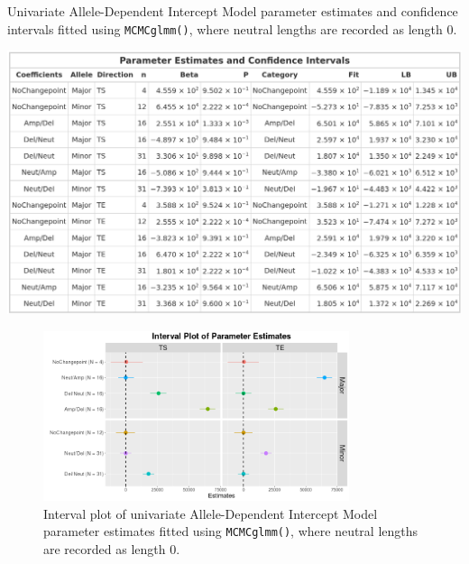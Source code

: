 \begin{table}[!htb]
\centering
\caption[Univariate Allele-Dependent Intercept Model parameter estimates and confidence intervals fitted using \texttt{MCMCglmm()}.]{Univariate Allele-Dependent Intercept Model parameter estimates and confidence intervals fitted using \texttt{MCMCglmm()}, where neutral lengths are recorded as length 0.}
      
\includegraphics[width = 1\textwidth]{../tables/Chapter_5/Univariate_MCMC_7_AD_Model_Pred.png}
\end{table}

\begin{figure}[!htb]
\vspace{0.5cm}
     
\centering
\includegraphics[width = 0.8\textwidth]{../figures/Chapter_5/Univariate_MCMC_7_AD_Interval.png}
 
\caption[Interval plot of univariate Allele-Dependent Intercept Model parameter estimates fitted using \texttt{MCMCglmm()}.]{Interval plot of univariate Allele-Dependent Intercept Model parameter estimates fitted using \texttt{MCMCglmm()}, where neutral lengths are recorded as length 0.}
\end{figure}

